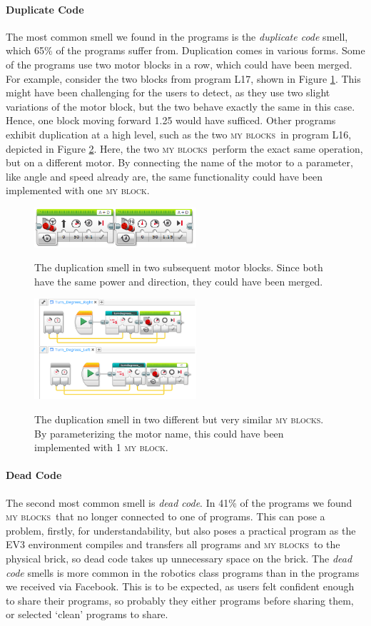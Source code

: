 \documentclass{sig-alternate}
\newcommand{\mbs}{\textsc{my blocks}}
\newcommand{\mb}{\textsc{my block}}
\begin{document}
\paragraph{Duplicate Code}
The most common smell we found in the programs is the \emph{duplicate code} smell, which 65\% of the programs suffer from. Duplication comes in various forms.  Some of the programs use two motor blocks in a row, which could have been merged. For example, consider the two blocks from program L17, shown in Figure \ref{fig:dup_ev3}. This might have been challenging for the users to detect, as they use two slight variations of the motor block, but the two behave exactly the same in this case. Hence, one block moving forward 1.25 would have sufficed. Other programs exhibit duplication at a high level, such as the two \mbs~in program L16, depicted in Figure \ref{fig:dup_ev3_myblocks}. Here, the two \mbs~perform the exact same operation, but on a different motor. By connecting the name of the motor to a parameter, like angle and speed already are, the same functionality could have been implemented with one \mb.

\begin{figure} [tb]
\caption{The duplication smell in two subsequent motor blocks. Since both have the same power and direction, they could have been merged. }
\centering
\includegraphics[width=6cm]{img/dup_ev3}
\label{fig:dup_ev3}
\end{figure}

\begin{figure} [tb]
\caption{The duplication smell in two different but very similar \mbs. By parameterizing the motor name, this could have been implemented with 1 \mb. }
\centering
\includegraphics[width=6cm]{img/dup_ev3_myblocks}
\label{fig:dup_ev3_myblocks}
\end{figure}

\paragraph{Dead Code}
The second most common smell is \emph{dead code}. In 41\% of the programs we found \mbs~that no longer connected to one of programs. This can pose a problem, firstly, for understandability, but also poses a practical program as the EV3 environment compiles and transfers all programs and \mbs~to the physical brick, so dead code takes up unnecessary space on the brick. The \emph{dead code} smells is more common in the robotics class programs than in the programs we received via Facebook. This is to be expected, as users felt confident enough to share their programs, so probably they either programs before sharing them, or selected `clean' programs to share.
\end{document}

